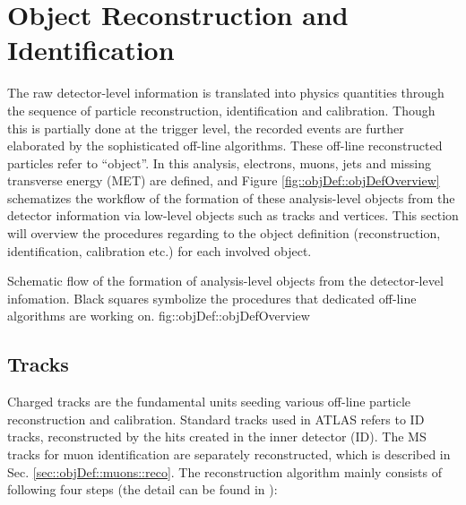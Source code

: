 \chapter{Object Reconstruction and Identification}  \label{sec::objDef}
The raw detector-level information is translated into physics quantities through the sequence of particle reconstruction, identification and calibration.
Though this is partially done at the trigger level, the recorded events are further elaborated by the sophisticated off-line algorithms. 
These off-line reconstructed particles refer to ``object''. 
In this analysis, electrons, muons, jets and missing transverse energy (MET) are defined, 
and Figure \ref{fig::objDef::objDefOverview} schematizes the workflow of the formation of these analysis-level objects from the detector information via low-level objects such as tracks and vertices. 
This section will overview the procedures regarding to the object definition (reconstruction, identification, calibration etc.) for each involved object.

{Schematic flow of the formation of analysis-level objects from the detector-level infomation. 
Black squares symbolize the procedures that dedicated off-line algorithms are working on.}
{fig::objDef::objDefOverview}

\clearpage
\section{Tracks} \label{sec::objDef::tracks}
Charged tracks are the fundamental units seeding various off-line particle reconstruction and calibration.
Standard tracks used in ATLAS refers to ID tracks, reconstructed by the hits created in the inner detector (ID).
The MS tracks for muon identification are separately reconstructed, which is described in Sec. \ref{sec::objDef::muons::reco}.
The reconstruction algorithm mainly consists of following four steps (the detail can be found in \cite{130_trackingRun2}): 

